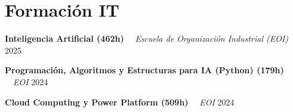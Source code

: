 \documentclass[letterpaper,11pt]{article}
\begin{document}
\section{Formación IT}
    \noindent
    \begin{minipage}[t]{1.0\linewidth}
        {\textbf{Inteligencia Artificial (462h)}} 
        \ \textendash \ 
        {\color{detailgray}\textit{Escuela de Organización Industrial (EOI)}}
        \hfill 
        {\small 2025}
    \end{minipage}
    \par 
    \vspace{0.1cm} %
    \noindent
    \begin{minipage}[t]{1.0\linewidth}
        {\textbf{Programación, Algoritmos y Estructuras para IA (Python) (179h)}} 
        \ \textendash \ 
        {\color{detailgray}\textit{EOI}}
        \hfill 
        {\small 2024}
    \end{minipage}
    \par 
    \vspace{0.1cm} %
    \noindent
    \begin{minipage}[t]{1.0\linewidth}
        {\textbf{Cloud Computing y Power Platform (509h)}} 
        \ \textendash \ 
        {\color{detailgray}\textit{EOI}}
        \hfill 
        {\small 2024}
    \end{minipage}
    \par 
    \vspace{0.1cm} %

\end{document}
